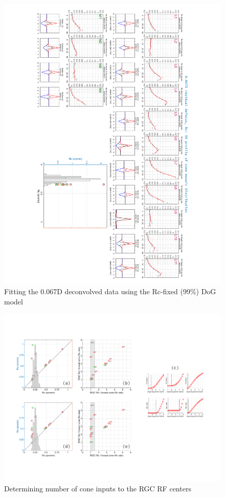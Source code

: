 \documentclass[11pt, oneside]{article}   	%
\begin{document}
\begin{figure}[htbp] %
   \centering
   \includegraphics[width=7in]{Slide6.pdf} 
   \caption{Fitting the 0.067D deconvolved data using the Rc-fixed (99\%) DoG model}
   \label{fig:example}
\end{figure}

\begin{figure}[htbp] %
   \centering
   \includegraphics[width=8in]{Slide7.pdf} 
   \caption{Determining number of cone inputs to the RGC RF centers}
   \label{fig:example}
\end{figure}
\end{document}
